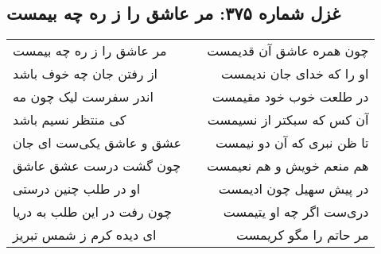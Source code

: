 \begin{center}
\section*{غزل شماره ۳۷۵: مر عاشق را ز ره چه بیمست}
\label{sec:0375}
\begin{longtable}{l p{0.5cm} r}
مر عاشق را ز ره چه بیمست
&&
چون همره عاشق آن قدیمست
\\
از رفتن جان چه خوف باشد
&&
او را که خدای جان ندیمست
\\
اندر سفرست لیک چون مه
&&
در طلعت خوب خود مقیمست
\\
کی منتظر نسیم باشد
&&
آن کس که سبکتر از نسیمست
\\
عشق و عاشق یکی‌ست ای جان
&&
تا ظن نبری که آن دو نیمست
\\
چون گشت درست عشق عاشق
&&
هم منعم خویش و هم نعیمست
\\
او در طلب چنین درستی
&&
در پیش سهیل چون ادیمست
\\
چون رفت در این طلب به دریا
&&
دری‌ست اگر چه او یتیمست
\\
ای دیده کرم ز شمس تبریز
&&
مر حاتم را مگو کریمست
\\
\end{longtable}
\end{center}

